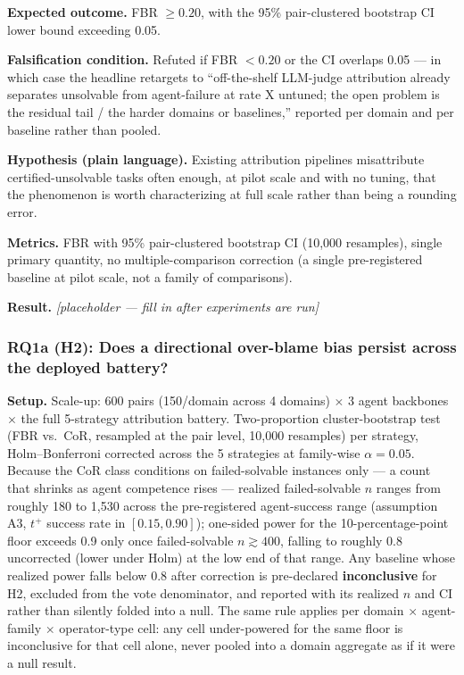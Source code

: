 \documentclass[11pt]{article}
\newcommand{\ph}{\textit{[placeholder --- fill in after experiments are run]}}
\begin{document}
\textbf{Expected outcome.} FBR $\geq 0.20$, with the 95\% pair-clustered bootstrap CI lower bound exceeding 0.05.

\textbf{Falsification condition.} Refuted if FBR $< 0.20$ or the CI overlaps 0.05 --- in which case the headline retargets to ``off-the-shelf LLM-judge attribution already separates unsolvable from agent-failure at rate X untuned; the open problem is the residual tail / the harder domains or baselines,'' reported per domain and per baseline rather than pooled.

\textbf{Hypothesis (plain language).} Existing attribution pipelines misattribute certified-unsolvable tasks often enough, at pilot scale and with no tuning, that the phenomenon is worth characterizing at full scale rather than being a rounding error.

\textbf{Metrics.} FBR with 95\% pair-clustered bootstrap CI (10{,}000 resamples), single primary quantity, no multiple-comparison correction (a single pre-registered baseline at pilot scale, not a family of comparisons).

\textbf{Result.} \ph

\subsubsection{RQ1a (H2): Does a directional over-blame bias persist across the deployed battery?}
\textbf{Setup.} Scale-up: 600 pairs (150/domain across 4 domains) $\times$ 3 agent backbones $\times$ the full 5-strategy attribution battery. Two-proportion cluster-bootstrap test (FBR vs.\ CoR, resampled at the pair level, 10{,}000 resamples) per strategy, Holm--Bonferroni corrected across the 5 strategies at family-wise $\alpha=0.05$. Because the CoR class conditions on failed-solvable instances only --- a count that shrinks as agent competence rises --- realized failed-solvable $n$ ranges from roughly 180 to 1{,}530 across the pre-registered agent-success range (assumption A3, $t^+$ success rate in $[0.15, 0.90]$); one-sided power for the 10-percentage-point floor exceeds 0.9 only once failed-solvable $n \gtrsim 400$, falling to roughly 0.8 uncorrected (lower under Holm) at the low end of that range. Any baseline whose realized power falls below 0.8 after correction is pre-declared \textbf{inconclusive} for H2, excluded from the vote denominator, and reported with its realized $n$ and CI rather than silently folded into a null. The same rule applies per domain $\times$ agent-family $\times$ operator-type cell: any cell under-powered for the same floor is inconclusive for that cell alone, never pooled into a domain aggregate as if it were a null result.
\end{document}
